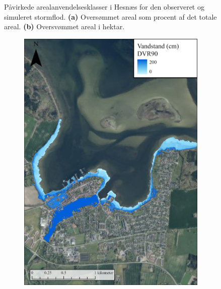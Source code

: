 \begin{figure}[H]
\begin{subfigure}[b]{0.5\textwidth}
        \caption{}
        \label{Subfig: Hektar Hesnæs}
    \end{subfigure}
    \caption{Påvirkede arealanvendelsesklasser i Hesnæs for den observeret og simuleret stormflod. \textbf{(a)} Oversømmet areal som procent af det totale areal. \textbf{(b)} Oversvømmet areal i hektar.}
    \label{Figur: Påvirket arealanvendelse Hesnæs}
\end{figure}



\begin{figure}[H]
    \begin{subfigure}[t]{0.5\textwidth}
        \centering
        \includegraphics[width=0.95\linewidth]{images/Resultater/2023Malt/2023 resultat_praestoe.jpg}
        \caption{}
        \label{Subfig: Målt Præstø}
    \end{subfigure}
    \begin{subfigure}[t]{0.5\textwidth}
        \centering

\end{subfigure}
\end{figure}
